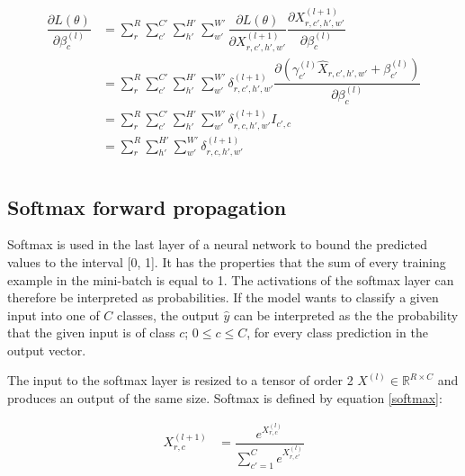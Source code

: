 \documentclass[a4paper, twoside]{article}
\newcommand*{\pd}[2]{\ensuremath{\dfrac{\partial #1}{\partial #2}}}
\begin{document}
\begin{align}
\begin{split}
	\pd{L(\theta)}{\beta^{(l)}_{c}}
		& = \sum^{R }_{r} \sum^{C' }_{c'} \sum^{H' }_{h'} \sum^{W' }_{w'} \pd{L(\theta)}{X^{(l+1)}_{r,c',h',w'}} \pd{X^{(l+1)}_{r,c',h',w'}}{\beta^{(l)}_{c}} \\
		& = \sum^{R }_{r} \sum^{C' }_{c'} \sum^{H' }_{h'} \sum^{W' }_{w'} \delta^{(l+1)}_{r,c',h',w'}  \pd{({\gamma_{c'}^{(l)} \hat{X}_{r,c',h',w'} + \beta_{c'}^{(l)}})}{\beta^{(l)}_{c}} \\
		& = \sum^{R }_{r} \sum^{C' }_{c'} \sum^{H' }_{h'} \sum^{W' }_{w'} \delta^{(l+1)}_{r,c,h',w'} I_{c',c}\\
		& = \sum^{R }_{r} \sum^{H' }_{h'} \sum^{W' }_{w'} \delta^{(l+1)}_{r,c,h',w'} \\
\end{split}
\end{align}

\subsection{Softmax forward propagation}
Softmax is used in the last layer of a neural network to bound the predicted values to the interval [0, 1]. It has the properties that the sum of every training example in the mini-batch is equal to 1. The activations of the softmax layer can therefore be interpreted as probabilities. If the model wants to classify a given input into one of $C$ classes, the output $\hat{y}$ can be interpreted as the the probability that the given input is of class $c$; $0 \leq c \leq C$, for every class prediction in the output vector. \cite{cs231n}

The input to the softmax layer is resized to a tensor of order 2 $X^{(l)} \in \mathbb{R}^{R \times C}$ and produces an output of the same size. Softmax is defined by equation \eqref{softmax}: \cite{cs231n}

\begin{equation}\label{softmax}
\begin{split}
X^{(l+1)}_{r,c}
	& = \dfrac{e^{X^{(l)}_{r,c}}}{\sum^{C }_{c'=1}e^{X^{(l)}_{r,c'}}} \\
\end{split}
\end{equation}
\end{document}
